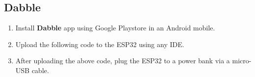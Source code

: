 \documentclass[conference]{IEEEtran}
\begin{document}
\subsection{Dabble}
\begin{enumerate}[label=\thesection.\arabic*
,ref=\thesection.\theenumi]

\item Install \textbf{Dabble} app using Google Playstore in an Android mobile.

\item Upload the following code to the ESP32 using any IDE.

\item After uploading the above code, plug the ESP32 to a power bank via a micro-USB cable.


\end{enumerate}
\end{document}
